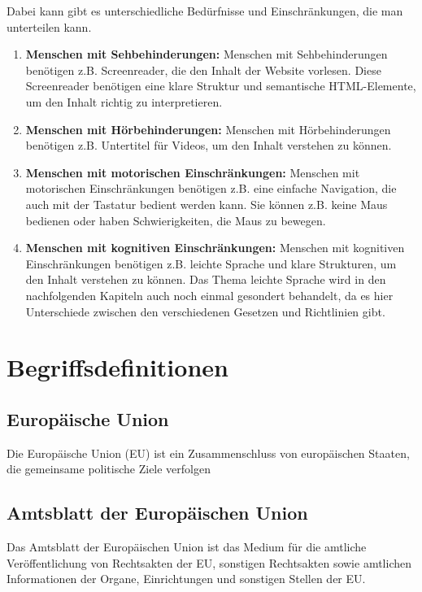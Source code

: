 Dabei kann gibt es unterschiedliche Bedürfnisse und Einschränkungen, die man unterteilen kann.

\begin{enumerate}
\item \textbf{Menschen mit Sehbehinderungen:} Menschen mit Sehbehinderungen benötigen z.B. Screenreader, die den Inhalt der Website vorlesen. Diese Screenreader benötigen eine klare Struktur und semantische HTML-Elemente, um den Inhalt richtig zu interpretieren.

\item \textbf{Menschen mit Hörbehinderungen:} Menschen mit Hörbehinderungen benötigen z.B. Untertitel für Videos, um den Inhalt verstehen zu können.

\item \textbf{Menschen mit motorischen Einschränkungen:} Menschen mit motorischen Einschränkungen benötigen z.B. eine einfache Navigation, die auch mit der Tastatur bedient werden kann. Sie können z.B. keine Maus bedienen oder haben Schwierigkeiten, die Maus zu bewegen.

\item \textbf{Menschen mit kognitiven Einschränkungen:} Menschen mit kognitiven Einschränkungen benötigen z.B. leichte Sprache und klare Strukturen, um den Inhalt verstehen zu können. Das Thema leichte Sprache wird in den nachfolgenden Kapiteln auch noch einmal gesondert behandelt, da es hier Unterschiede zwischen den verschiedenen Gesetzen und Richtlinien gibt.

\end{enumerate}

\section{Begriffsdefinitionen}
\subsection{Europäische Union}
Die Europäische Union (EU) ist ein Zusammenschluss von europäischen Staaten, die gemeinsame politische Ziele verfolgen \parencite{bpb_eu_2025}

\subsection{Amtsblatt der Europäischen Union}
Das Amtsblatt der Europäischen Union ist das Medium für die amtliche Veröffentlichung von Rechtsakten der EU, sonstigen Rechtsakten sowie amtlichen Informationen der Organe, Einrichtungen und sonstigen Stellen der EU.

